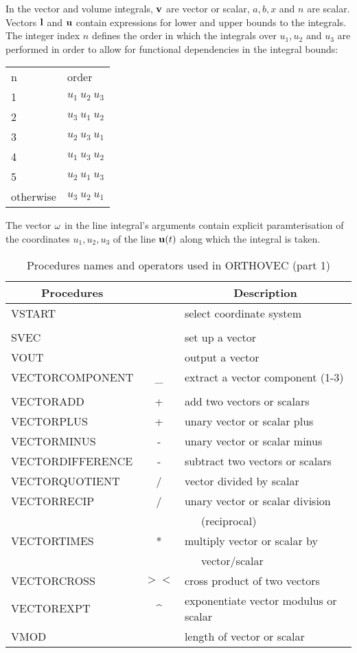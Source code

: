 In the vector and volume integrals, ${\bf v}$ are vector or scalar,
$a, b,x$ and $n$ are scalar.  Vectors ${\bf l}$ and ${\bf u}$ contain
expressions for lower and upper bounds to the integrals.  The integer
index $n$ defines the order in which the integrals over $u_1, u_2$ and
$u_3$ are performed in order to allow for functional dependencies in
the integral bounds:

\begin{center}
\begin{tabular}{ll}
n & order\\ 1 & $u_1~u_2~u_3$\\
%
2 & $u_3~u_1~u_2$\\
%
3 & $u_2~u_3~u_1$\\
%
4 & $u_1~u_3~u_2$\\
%
5 & $u_2~u_1~u_3$\\ otherwise & $u_3~u_2~u_1$\\
\end{tabular}
\end{center}


The vector ${\bf \omega}$ in the line integral's arguments contain
explicit paramterisation of the coordinates $u_1, u_2, u_3$ of the
line ${\bf u}(t)$ along which the integral is taken.

\begin{table}
\begin{center}
\begin{tabular}{|l c l|} \hline
\multicolumn{1}{|c}{Procedures} & & \multicolumn{1}{c|}{Description} \\ \hline
VSTART & & select coordinate
system \\ & & \\ SVEC & & set up a vector \\ VOUT & & output a vector
\\ VECTORCOMPONENT & \_ & extract a vector component (1-3) \\ & & \\
VECTORADD & + & add two vectors or scalars \\
VECTORPLUS & + & unary vector or scalar plus\\
VECTORMINUS & - & unary vector or scalar minus\\
VECTORDIFFERENCE & - & subtract two vectors or scalars \\
VECTORQUOTIENT & / & vector divided by scalar \\
VECTORRECIP & / & unary vector or scalar division \\ & & \ \ \ (reciprocal)\\
VECTORTIMES & * & multiply vector or scalar by \\ & & \ \ \ vector/scalar \\
VECTORCROSS & $><$ & cross product of two vectors \\
VECTOREXPT & \^{} & exponentiate vector modulus or scalar \\
VMOD & & length of vector or scalar \\ \hline
\end{tabular}
\end{center}
\caption{Procedures names and operators used in ORTHOVEC (part 1)}
\end{table}

